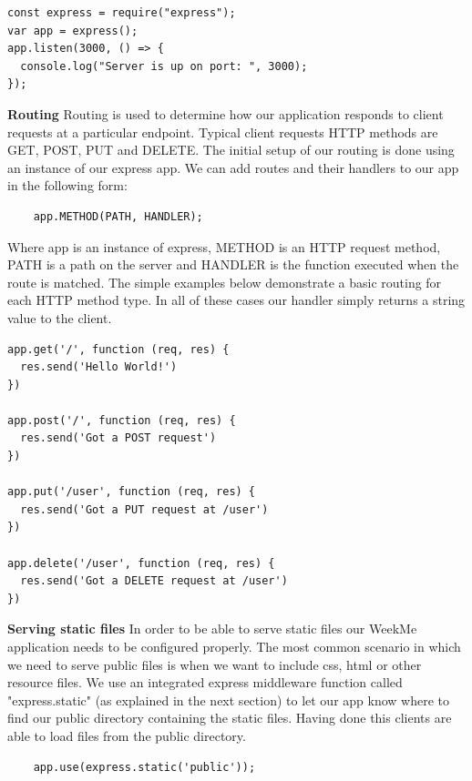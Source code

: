 \begin{lstlisting}
const express = require("express");
var app = express();
app.listen(3000, () => {
  console.log("Server is up on port: ", 3000); 
});  
\end{lstlisting}    



\textbf{Routing} 
Routing is used to determine how our application responds to client requests at a particular endpoint.  
Typical client requests HTTP methods are GET, POST, PUT and DELETE. The initial setup of our routing is done using an instance of our express app. We can add routes and their handlers to our app in the following form:

\begin{lstlisting}
	app.METHOD(PATH, HANDLER); 
\end{lstlisting}

Where app is an instance of express, METHOD is an HTTP request method, PATH is a path on the server and HANDLER is the function executed when the route is matched. The simple examples below demonstrate a basic routing for each HTTP method type. In all of these cases our handler simply returns a string value to the client.   

\begin{lstlisting}
app.get('/', function (req, res) {
  res.send('Hello World!')
})

app.post('/', function (req, res) {
  res.send('Got a POST request')
})

app.put('/user', function (req, res) {
  res.send('Got a PUT request at /user')
})

app.delete('/user', function (req, res) {
  res.send('Got a DELETE request at /user')
})

\end{lstlisting}


\textbf{Serving static files}
In order to be able to serve static files our WeekMe application needs to be configured properly. The most common scenario in which we need to serve public files is when we want to include css, html or other resource files. We use an integrated express middleware function called "express.static" (as explained in the next section) to let our app know where to find our public directory containing the static files. Having done this clients are able to load files from the public directory.     

\begin{lstlisting}
	app.use(express.static('public'));  
\end{lstlisting}

